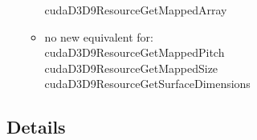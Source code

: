 \begin{frame}
\begin{enumerate}
\begin{itemize}
											     {\color{blue}cudaD3D9ResourceGetMappedArray}
			\item no new equivalent for:\\
			 {\color{blue}cudaD3D9ResourceGetMappedPitch}\\
			{\color{blue}cudaD3D9ResourceGetMappedSize}\\
			{\color{blue}cudaD3D9ResourceGetSurfaceDimensions}
			\end{itemize}
	\end{enumerate}
\end{frame}




\subsection{Details}
